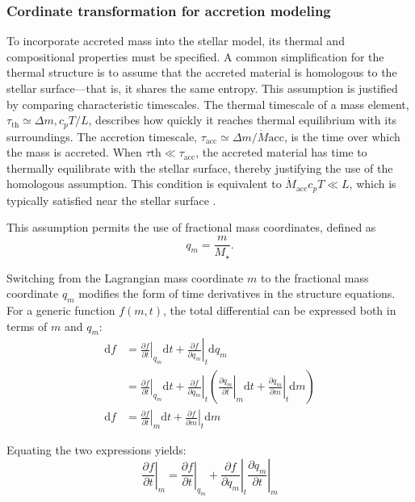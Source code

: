 \documentclass[12pt,a4paper]{article}
\newcommand{\pfird}[2][]{\frac{\partial#1}{\partial#2}}
\newcommand{\dd}[1]{\mathrm{d}#1}
\begin{document}
\subsubsection{Cordinate transformation for accretion modeling}
\label{sec:accretion_coords}

To incorporate accreted mass into the stellar model, its thermal and compositional properties must be specified. A common simplification for the thermal structure is to assume that the accreted material is homologous to the stellar surface—that is, it shares the same entropy. This assumption is justified by comparing characteristic timescales. The thermal timescale of a mass element, $\tau_\mathrm{th} \simeq \Delta m, c_p T / L$, describes how quickly it reaches thermal equilibrium with its surroundings. The accretion timescale, $\tau_\mathrm{acc} \simeq \Delta m / \dot{M}\mathrm{acc}$, is the time over which the mass is accreted. When $\tau\mathrm{th} \ll \tau_\mathrm{acc}$, the accreted material has time to thermally equilibrate with the stellar surface,  thereby justifying the use of the homologous assumption. This condition is equivalent to $\dot{M}_\mathrm{acc} c_p T \ll L$, which is typically satisfied near the stellar surface \parencite{SugimotoNomoto1975,PaxtonEtAl2015}. 

This assumption permits the use of fractional mass coordinates, defined as \parencite{SugimotoNomoto1975}
\begin{equation}
  q_m = \frac{m}{M_\star}.
\end{equation}

Switching from the Lagrangian mass coordinate $m$ to the fractional mass coordinate $q_m$ modifies the form of time derivatives in the structure equations. For a generic function $f(m,t)$, the total differential can be expressed both in terms of $m$ and $q_m$:
\begin{align}
  \dd{f} &= \left.\pfird[f]{t}\right|_{q_m} \dd{t} + \left.\pfird[f]{q_m}\right|_t\dd{q_m}\\ 
  &= \left.\pfird[f]{t}\right|_{q_m} \dd{t} + \left.\pfird[f]{q_m}\right|_t\left(\left.\pfird[q_m]{t}\right|_m \dd{t} + \left.\pfird[q_m]{m}\right|_t \dd{m}\right)\\
  \dd{f} &= \left.\pfird[f]{t}\right|_m \dd{t} + \left.\pfird[f]{m}\right|_t \dd{m}
\end{align}

Equating the two expressions yields:
\begin{equation}
  \left.\pfird[f]{t}\right|_m = \left.\pfird[f]{t}\right|_{q_m} + \left.\pfird[f]{q_m}\right|_t \left.\pfird[q_m]{t}\right|_m
\end{equation}
\end{document}
